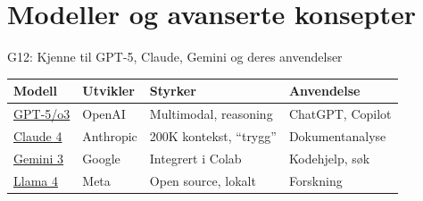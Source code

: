 \documentclass[aspectratio=169, 10pt]{beamer}
\begin{document}
\section{Modeller og avanserte konsepter}

\begin{frame}{G12: Kjenne til GPT-5, Claude, Gemini og deres anvendelser}
    \begin{center}
        \scriptsize
        \begin{tabular}{lp{3cm}p{3.5cm}p{2.5cm}}
            \toprule
            \textbf{Modell} & \textbf{Utvikler} & \textbf{Styrker} & \textbf{Anvendelse} \\
            \midrule
            \href{https://openai.com/gpt-5}{GPT-5/o3} & OpenAI & Multimodal, reasoning & ChatGPT, Copilot \\
            \href{https://www.anthropic.com/claude}{Claude 4} & Anthropic & 200K kontekst, ``trygg'' & Dokumentanalyse \\
            \href{https://deepmind.google/gemini}{Gemini 3} & Google & Integrert i Colab & Kodehjelp, søk \\
            \href{https://llama.meta.com/}{Llama 4} & Meta & Open source, lokalt & Forskning \\
            \bottomrule
        \end{tabular}
    \end{center}


\end{frame}
\end{document}
